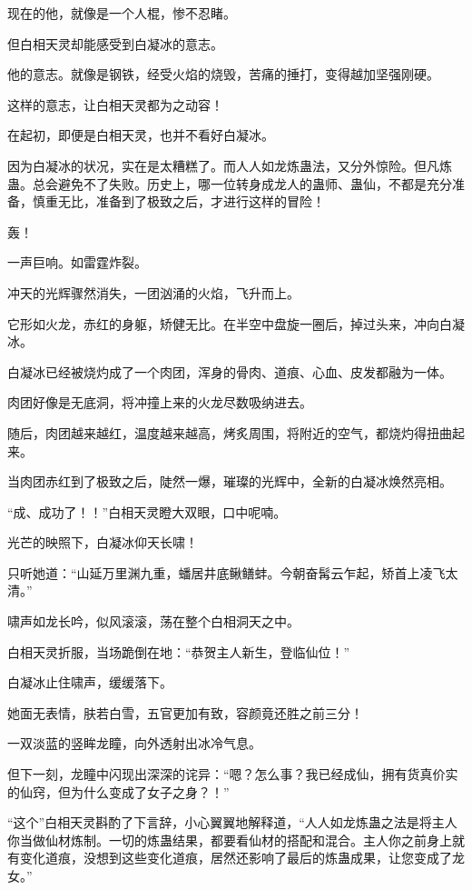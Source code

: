 \begin{this_body}
现在的他，就像是一个人棍，惨不忍睹。

但白相天灵却能感受到白凝冰的意志。

他的意志。就像是钢铁，经受火焰的烧毁，苦痛的捶打，变得越加坚强刚硬。

这样的意志，让白相天灵都为之动容！

在起初，即便是白相天灵，也并不看好白凝冰。

因为白凝冰的状况，实在是太糟糕了。而人人如龙炼蛊法，又分外惊险。但凡炼蛊。总会避免不了失败。历史上，哪一位转身成龙人的蛊师、蛊仙，不都是充分准备，慎重无比，准备到了极致之后，才进行这样的冒险！

轰！

一声巨响。如雷霆炸裂。

冲天的光辉骤然消失，一团汹涌的火焰，飞升而上。

它形如火龙，赤红的身躯，矫健无比。在半空中盘旋一圈后，掉过头来，冲向白凝冰。

白凝冰已经被烧灼成了一个肉团，浑身的骨肉、道痕、心血、皮发都融为一体。

肉团好像是无底洞，将冲撞上来的火龙尽数吸纳进去。

随后，肉团越来越红，温度越来越高，烤炙周围，将附近的空气，都烧灼得扭曲起来。

当肉团赤红到了极致之后，陡然一爆，璀璨的光辉中，全新的白凝冰焕然亮相。

“成、成功了！！”白相天灵瞪大双眼，口中呢喃。

光芒的映照下，白凝冰仰天长啸！

只听她道：“山延万里渊九重，蟠居井底鳅鳝蚌。今朝奋髯云乍起，矫首上凌飞太清。”

啸声如龙长吟，似风滚滚，荡在整个白相洞天之中。

白相天灵折服，当场跪倒在地：“恭贺主人新生，登临仙位！”

白凝冰止住啸声，缓缓落下。

她面无表情，肤若白雪，五官更加有致，容颜竟还胜之前三分！

一双淡蓝的竖眸龙瞳，向外透射出冰冷气息。

但下一刻，龙瞳中闪现出深深的诧异：“嗯？怎么事？我已经成仙，拥有货真价实的仙窍，但为什么变成了女子之身？！”

“这个”白相天灵斟酌了下言辞，小心翼翼地解释道，“人人如龙炼蛊之法是将主人你当做仙材炼制。一切的炼蛊结果，都要看仙材的搭配和混合。主人你之前身上就有变化道痕，没想到这些变化道痕，居然还影响了最后的炼蛊成果，让您变成了龙女。”


\end{this_body}
